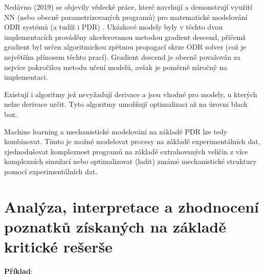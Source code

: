 Nedávno (2019) se objevily vědecké práce, které navrhují a demonstrují využití
NN (nebo obecně parametrizovaných programů) pro matematické modelování ODR
systémů (a tudíž i PDR) \cite{diffEqFlux2019, chen2018neural}. Ukázkové modely
byly v těchto dvou implementacích prováděny akcelerovanou metodou gradient
descend, přičemž gradient byl určen algoritmickou zpětnou propagací skrze ODR
solver (což je největším přínosem těchto prací). Gradient descend je obecně
považován za nejvíce pokročilou metodu učení modelů, avšak je poměrně náročný
na implementaci.

Existují i algoritmy jež nevyžadují derivace a jsou vhodné pro modely, u
kterých nelze derivace určit. Tyto algoritmy umožňují optimalizaci až na úrovni
black box.

Machine learning a mechanistické modelování na základě PDR lze tedy kombinovat.
Tímto je možné modelovat procesy na základě experimentálních dat, zjednodušovat
komplexnost programů na základě extrahovaných veličin z více komplexních
simulací nebo optimalizovat (ladit) zmámé mechanistické struktury pomocí
experimentálních dat.


\chapter{Analýza, interpretace a zhodnocení poznatků získaných na základě
kritické rešerše}
\textbf{Příklad}:
